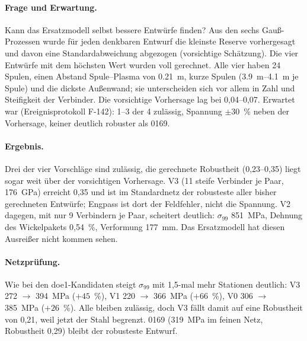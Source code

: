 \paragraph{Frage und Erwartung.} Kann das Ersatzmodell selbst bessere Entwürfe finden? Aus den sechs Gauß-Prozessen
wurde für jeden denkbaren Entwurf die kleinste Reserve vorhergesagt und davon eine Standardabweichung abgezogen
(vorsichtige Schätzung). Die vier Entwürfe mit dem höchsten Wert wurden voll gerechnet. Alle vier haben 24 Spulen,
einen Abstand Spule--Plasma von \SI{0,21}{m}, kurze Spulen (\SIrange{3,9}{4,1}{m} je Spule) und die dickste
Außenwand; sie unterscheiden sich vor allem in Zahl und Steifigkeit der Verbinder. Die vorsichtige Vorhersage lag bei
0,04--0,07. Erwartet war (Ereignisprotokoll F-142): 1--3 der 4 zulässig, Spannung $\pm30$~\% neben der Vorhersage,
keiner deutlich robuster als 0169.

\begin{table}[H]\centering\scriptsize\caption{Vorschläge des Ersatzmodells.
$E_\text{V}$ Verbindersteifigkeit, V./Paar Verbinder je Spulenpaar, „fein“ = 1,5-mal mehr Stationen.
Robustheit = kleinste Reserve über alle acht Grenzen; „vorherges.“ = Vorhersage minus eine Standardabweichung.}
\end{table}

\paragraph{Ergebnis.} Drei der vier Vorschläge sind zulässig, die gerechnete Robustheit (0,23--0,35) liegt sogar
weit über der vorsichtigen Vorhersage. V3 (11 steife Verbinder je Paar, \SI{176}{GPa}) erreicht 0,35 und ist im
Standardnetz der robusteste aller bisher gerechneten Entwürfe; Engpass ist dort der Feldfehler, nicht die Spannung.
V2 dagegen, mit nur 9 Verbindern je Paar, scheitert deutlich: $\sigma_{99}$ \SI{851}{MPa}, Dehnung des Wickelpakets
0,54~\%, Verformung \SI{177}{mm}. Das Ersatzmodell hat diesen Ausreißer nicht kommen sehen.

\paragraph{Netzprüfung.} Wie bei den doe1-Kandidaten steigt $\sigma_{99}$ mit 1,5-mal mehr Stationen deutlich: V3
\SI{272}{} $\to$ \SI{394}{MPa} ($+45$~\%), V1 \SI{220}{} $\to$ \SI{366}{MPa} ($+66$~\%), V0 \SI{306}{} $\to$
\SI{385}{MPa} ($+26$~\%). Alle bleiben zulässig, doch V3 fällt damit auf eine Robustheit von 0,21, weil jetzt der
Stahl begrenzt. 0169 (\SI{319}{MPa} im feinen Netz, Robustheit 0,29) bleibt der robusteste Entwurf.


